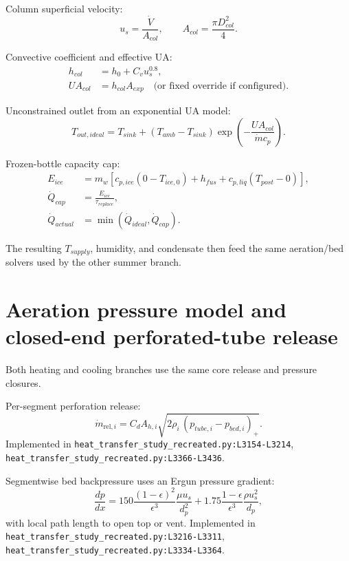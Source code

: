 \documentclass[11pt]{article}
\newcommand{\srcref}[1]{\nolinkurl{#1}}
\begin{document}
Column superficial velocity:
\begin{equation}
u_s = \frac{\dot V}{A_{col}}, \qquad
A_{col} = \frac{\pi D_{col}^2}{4}.
\end{equation}

Convective coefficient and effective UA:
\begin{align}
h_{col} &= h_0 + C_v u_s^{0.8}, \\
UA_{col} &= h_{col} A_{exp}
\quad \text{(or fixed override if configured)}.
\end{align}

Unconstrained outlet from an exponential UA model:
\begin{equation}
T_{out,ideal} = T_{sink} + (T_{amb}-T_{sink})
\exp\!\left(-\frac{UA_{col}}{\dot m c_p}\right).
\end{equation}

Frozen-bottle capacity cap:
\begin{align}
E_{ice} &= m_w\!\left[c_{p,ice}(0-T_{ice,0}) + h_{fus}
+ c_{p,liq}(T_{post}-0)\right], \\
\dot Q_{cap} &= \frac{E_{ice}}{\tau_{replace}}, \\
\dot Q_{actual} &= \min(\dot Q_{ideal},\dot Q_{cap}).
\end{align}

The resulting \(T_{supply}\), humidity, and condensate then feed the same
aeration/bed solvers used by the other summer branch.

\section{Aeration pressure model and closed-end perforated-tube release}
Both heating and cooling branches use the same core release and pressure closures.

Per-segment perforation release:
\begin{equation}
\dot m_{\mathrm{rel},i}
= C_d A_{h,i}\sqrt{2\rho_i\,(p_{tube,i}-p_{bed,i})_+}.
\end{equation}
Implemented in
\srcref{heat_transfer_study_recreated.py:L3154-L3214},
\srcref{heat_transfer_study_recreated.py:L3366-L3436}.

Segmentwise bed backpressure uses an Ergun pressure gradient:
\begin{equation}
\frac{d p}{d x}
=
150\frac{(1-\epsilon)^2}{\epsilon^3}
\frac{\mu u_s}{d_p^2}
+
1.75\frac{1-\epsilon}{\epsilon^3}
\frac{\rho u_s^2}{d_p},
\end{equation}
with local path length to open top or vent.
Implemented in
\srcref{heat_transfer_study_recreated.py:L3216-L3311},
\srcref{heat_transfer_study_recreated.py:L3334-L3364}.
\end{document}
